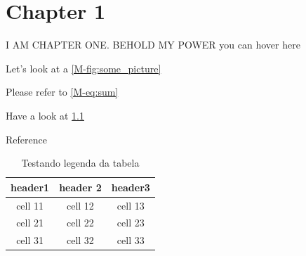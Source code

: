 \documentclass[../../main.tex]{subfiles}
\begin{document}
\chapter{Chapter 1}\label{chap:cap1}
I AM CHAPTER ONE. BEHOLD MY POWER  you can hover here
\TESTNEWCOMMAND

Let's look at a \cref{M-fig:some_picture}

Please refer to \cref{M-eq:sum}

Have a look at \cref{tab:test_table}

Reference \cite{timoshenko_theory_1985}
%
\begin{table}[h]
    \centering
    \caption{Testando legenda da tabela}
    \label{tab:test_table}
    \begin{tabular}{|c||c||c|}
        header1 & header 2 & header3\\[0.5ex]
        \hline
        cell 11 & cell 12 & cell 13\\
        cell 21 & cell 22 & cell 23\\
        cell 31 & cell 32 & cell 33
    \end{tabular}
    \end{table}

\ifSubfilesClassLoaded{%
    \printbibliography
}{}
\end{document}
